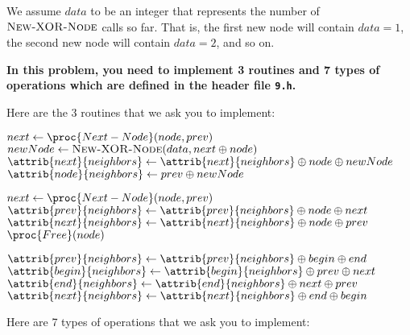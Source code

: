 We assume $data$ to be an integer that represents the number of $\textsc{New-XOR-Node}$ calls so far. That is, the first new node will contain $data = 1$, the second new node will contain $data = 2$, and so on.

\textbf{In this problem, you need to implement 3 routines and 7 types of operations which are defined in the header file \texttt{9.h}.}

Here are the 3 routines that we ask you to implement:

\begin{codebox}
\li $next \gets \proc{Next-Node}(node, prev)$
\li $newNode \gets \textsc{New-XOR-Node}(data, next \oplus node)$
\li $\attrib{next}{neighbors} \gets \attrib{next}{neighbors} \oplus node \oplus newNode$
\li $\attrib{node}{neighbors} \gets prev \oplus newNode$
\End
\end{codebox}

\begin{codebox}
\li $next \gets \proc{Next-Node}(node, prev)$
\li $\attrib{prev}{neighbors} \gets \attrib{prev}{neighbors} \oplus node \oplus next$
\li $\attrib{next}{neighbors} \gets \attrib{next}{neighbors} \oplus node \oplus prev$
\li $\proc{Free}(node)$
\End
\end{codebox}

\begin{codebox}
\li $\attrib{prev}{neighbors} \gets \attrib{prev}{neighbors} \oplus begin \oplus end$
\li $\attrib{begin}{neighbors} \gets \attrib{begin}{neighbors} \oplus prev \oplus next$
\li $\attrib{end}{neighbors} \gets \attrib{end}{neighbors} \oplus next \oplus prev$
\li $\attrib{next}{neighbors} \gets \attrib{next}{neighbors} \oplus end \oplus begin$
\End
\end{codebox}

Here are 7 types of operations that we ask you to implement:

